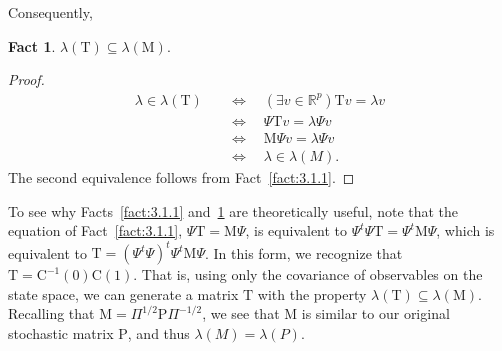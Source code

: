 \documentclass[12pt,letterpaper]{report}
\theoremstyle{plain}
\theoremstyle{definition}
\newtheorem*{fact}{Fact}
\theoremstyle{remark}
\numberwithin{theorem}{chapter}
\numberwithin{claim}{chapter}
\numberwithin{equation}{chapter}
\numberwithin{conjecture}{chapter}
\newcommand\R{\ensuremath{\mathbb{R}}}
\newcommand\C{\ensuremath{\mathrm{C}}}
\renewcommand\P{\ensuremath{\mathrm{P}}}
\newcommand\M{\ensuremath{\mathrm{M}}}
\newcommand\T{\ensuremath{\mathrm{T}}}
\newcommand\<{\ensuremath{\langle}}
\renewcommand\>{\ensuremath{\rangle}}
\begin{document}
Consequently,
\begin{fact}
\label{fact:3.1.2}
$\lambda(\T) \subseteq \lambda(\M)$.
\end{fact}
\begin{proof}
~
\vskip-2cm
  \begin{align*}
\lambda \in \lambda(\T)
& \quad \Longleftrightarrow  \quad
(\exists v \in \R^p) \T v = \lambda v\\
& \quad \Longleftrightarrow  \quad
\Psi \T v = \lambda \Psi v\\
& \quad \Longleftrightarrow  \quad
\M \Psi v = \lambda \Psi v\\
& \quad \Longleftrightarrow  \quad
\lambda \in \lambda(M).
  \end{align*}
The second equivalence follows from Fact~\ref{fact:3.1.1}.  %
\end{proof}
To see why Facts~\ref{fact:3.1.1} and~\ref{fact:3.1.2} are theoretically useful,
note that the equation of Fact~\ref{fact:3.1.1}, $\Psi \T = \M \Psi$, is
equivalent to 
$\Psi^t\Psi \T = \Psi^t \M \Psi$, which is equivalent to 
$\T = (\Psi^t\Psi)^t \Psi^t \M\Psi$.
In this form, we recognize that $\T = \C^{-1}(0)\C(1)$. That is, using only the
covariance of observables on the state space, we can generate a matrix $\T$ with
the property $\lambda(\T) \subseteq \lambda(\M)$. Recalling that 
$\M = \Pi^{1/2}\P\Pi^{-1/2}$, 
we see that $\M$ is similar to our original stochastic matrix $\P$, 
and thus $\lambda(M) = \lambda(P)$.
\end{document}
